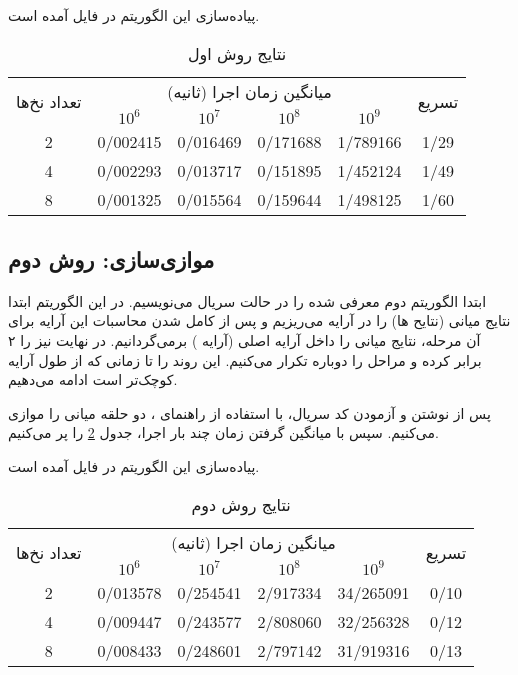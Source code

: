 \documentclass{HW}
\begin{document}
پیاده‌سازی این الگوریتم در فایل
آمده است.

\begin{table}[ht]
\caption{نتایج روش اول}
\begin{center}
\begin{tabular}{|c|c|c|c|c|c|}
    \hline
    \multirow{2}{*}{تعداد نخ‌ها} & \multicolumn{4}{|c|}{میانگین زمان اجرا (ثانیه)}& \multirow{2}{*}{تسریع} \\
    \cline{2-5}
& $10^6$ & $10^7$ & $10^8$ & $10^9$ & \\
    \hline
  2 & 0/002415 & 0/016469 & 0/171688 & 1/789166 & 1/29 \\ \hline
  4 & 0/002293 & 0/013717 & 0/151895 & 1/452124 & 1/49 \\ \hline
  8 & 0/001325 & 0/015564 & 0/159644 & 1/498125 & 1/60 \\ \hline
\end{tabular}
\end{center}
\label{tab:m1}
\end{table}

\subsection{موازی‌سازی: روش دوم}

ابتدا الگوریتم دوم معرفی شده را در حالت سریال می‌نویسیم. در این الگوریتم ابتدا نتایج میانی (نتایح ها) را در آرایه
می‌ریزیم و پس از کامل شدن محاسبات این آرایه برای آن مرحله، نتایج میانی را داخل آرایه اصلی (آرایه ) برمی‌گردانیم. در نهایت نیز  را ۲ برابر کرده و مراحل را دوباره تکرار می‌کنیم. این روند را تا زمانی که  از طول آرایه کوچک‌تر است ادامه می‌دهیم.

پس از نوشتن و آزمودن کد سریال، با استفاده از راهنمای ، دو حلقه میانی را موازی می‌کنیم. سپس با میانگین گرفتن زمان چند بار اجرا، جدول
\ref{tab:m2}
را پر می‌کنیم.

پیاده‌سازی این الگوریتم در فایل
آمده است.

\begin{table}[ht]
\caption{نتایج روش دوم}
\begin{center}
\begin{tabular}{|c|c|c|c|c|c|}
    \hline
    \multirow{2}{*}{تعداد نخ‌ها} & \multicolumn{4}{|c|}{میانگین زمان اجرا (ثانیه)}& \multirow{2}{*}{تسریع} \\
    \cline{2-5}
& $10^6$ & $10^7$ & $10^8$ & $10^9$ & \\
    \hline
  2 & 0/013578 & 0/254541 & 2/917334 & 34/265091 & 0/10 \\ \hline
  4 & 0/009447 & 0/243577 & 2/808060 & 32/256328 & 0/12 \\ \hline
  8 & 0/008433 & 0/248601 & 2/797142 & 31/919316 & 0/13 \\ \hline
\end{tabular}
\end{center}
\label{tab:m2}
\end{table}
\end{document}
